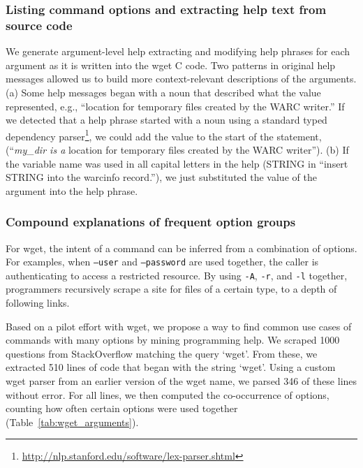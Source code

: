 \subsubsection{Listing command options and extracting help text from source code}

We generate argument-level help extracting and modifying help phrases for each argument as it is written into the wget C code.
Two patterns in original help messages allowed us to build more context-relevant descriptions of the arguments.
(a) Some help messages began with a noun that described what the value represented, e.g., ``location for temporary files created by the WARC writer.''
If we detected that a help phrase started with a noun using a standard typed dependency parser\footnote{\url{http://nlp.stanford.edu/software/lex-parser.shtml}}, we could add the value to the start of the statement, (``\emph{my\_dir is a} location for temporary files created by the WARC writer'').
(b) If the variable name was used in all capital letters in the help (STRING in ``insert STRING into the warcinfo record.''), we just substituted the value of the argument into the help phrase.

\subsubsection{Compound explanations of frequent option groups}

For wget, the intent of a command can be inferred from a combination of options.
For examples, when \texttt{--user} and \texttt{--password} are used together, the caller is authenticating to access a restricted resource.
By using \texttt{-A}, \texttt{-r}, and \texttt{-l} together, programmers recursively scrape a site for files of a certain type, to a depth of following links.

Based on a pilot effort with wget, we propose a way to find common use cases of commands with many options by mining programming help.
We scraped 1000 questions from StackOverflow matching the query `wget'.
From these, we extracted 510 lines of code that began with the string `wget'.
Using a custom wget parser from an earlier version of the wget \gls{name}, we parsed 346 of these lines without error.
For all lines, we then computed the co-occurrence of options, counting how often certain options were used together (Table~\ref{tab:wget_arguments}).

